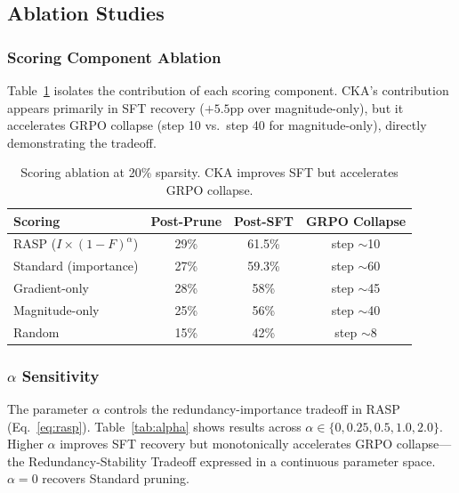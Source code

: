 \documentclass[11pt]{article}
\begin{document}
\subsection{Ablation Studies}
\label{sec:ablations}

\subsubsection{Scoring Component Ablation}

Table~\ref{tab:scoring_ablation} isolates the contribution of each scoring component.
CKA's contribution appears primarily in SFT recovery ($+5.5$pp over magnitude-only), but it accelerates GRPO collapse (step 10 vs.\ step 40 for magnitude-only), directly demonstrating the tradeoff.

\begin{table}[t]
\centering
\caption{Scoring ablation at 20\% sparsity. CKA improves SFT but accelerates GRPO collapse.}
\label{tab:scoring_ablation}
\begin{tabular}{lccc}
\toprule
\textbf{Scoring} & \textbf{Post-Prune} & \textbf{Post-SFT} & \textbf{GRPO Collapse} \\
\midrule
RASP ($I {\times} (1{-}F)^\alpha$) & 29\% & 61.5\% & step ${\sim}$10 \\
Standard (importance)    & 27\% & 59.3\% & step ${\sim}$60 \\
Gradient-only            & 28\% & 58\%   & step ${\sim}$45 \\
Magnitude-only           & 25\% & 56\%   & step ${\sim}$40 \\
Random                   & 15\% & 42\%   & step ${\sim}$8 \\
\bottomrule
\end{tabular}
\end{table}

\subsubsection{$\alpha$ Sensitivity}
\label{sec:alpha}

The parameter $\alpha$ controls the redundancy-importance tradeoff in RASP (Eq.~\ref{eq:rasp}).
Table~\ref{tab:alpha} shows results across $\alpha \in \{0, 0.25, 0.5, 1.0, 2.0\}$.
Higher $\alpha$ improves SFT recovery but monotonically accelerates GRPO collapse---the Redundancy-Stability Tradeoff expressed in a continuous parameter space.
$\alpha{=}0$ recovers Standard pruning.
\end{document}
